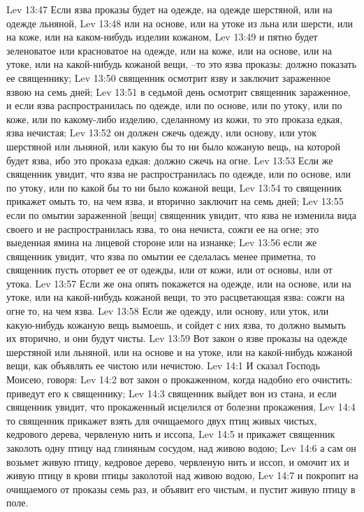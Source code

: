 Lev 13:47  Если язва проказы будет на одежде, на одежде шерстяной, или на одежде льняной,
Lev 13:48  или на основе, или на утоке из льна или шерсти, или на коже, или на каком-нибудь изделии кожаном,
Lev 13:49  и пятно будет зеленоватое или красноватое на одежде, или на коже, или на основе, или на утоке, или на какой-нибудь кожаной вещи, --то это язва проказы: должно показать ее священнику;
Lev 13:50  священник осмотрит язву и заключит зараженное язвою на семь дней;
Lev 13:51  в седьмой день осмотрит священник зараженное, и если язва распространилась по одежде, или по основе, или по утоку, или по коже, или по какому-либо изделию, сделанному из кожи, то это проказа едкая, язва нечистая;
Lev 13:52  он должен сжечь одежду, или основу, или уток шерстяной или льняной, или какую бы то ни было кожаную вещь, на которой будет язва, ибо это проказа едкая: должно сжечь на огне.
Lev 13:53  Если же священник увидит, что язва не распространилась по одежде, или по основе, или по утоку, или по какой бы то ни было кожаной вещи,
Lev 13:54  то священник прикажет омыть то, на чем язва, и вторично заключит на семь дней;
Lev 13:55  если по омытии зараженной [вещи] священник увидит, что язва не изменила вида своего и не распространилась язва, то она нечиста, сожги ее на огне; это выеденная ямина на лицевой стороне или на изнанке;
Lev 13:56  если же священник увидит, что язва по омытии ее сделалась менее приметна, то священник пусть оторвет ее от одежды, или от кожи, или от основы, или от утока.
Lev 13:57  Если же она опять покажется на одежде, или на основе, или на утоке, или на какой-нибудь кожаной вещи, то это расцветающая язва: сожги на огне то, на чем язва.
Lev 13:58  Если же одежду, или основу, или уток, или какую-нибудь кожаную вещь вымоешь, и сойдет с них язва, то должно вымыть их вторично, и они будут чисты.
Lev 13:59  Вот закон о язве проказы на одежде шерстяной или льняной, или на основе и на утоке, или на какой-нибудь кожаной вещи, как объявлять ее чистою или нечистою.
Lev 14:1  И сказал Господь Моисею, говоря:
Lev 14:2  вот закон о прокаженном, когда надобно его очистить: приведут его к священнику;
Lev 14:3  священник выйдет вон из стана, и если священник увидит, что прокаженный исцелился от болезни прокажения,
Lev 14:4  то священник прикажет взять для очищаемого двух птиц живых чистых, кедрового дерева, червленую нить и иссопа,
Lev 14:5  и прикажет священник заколоть одну птицу над глиняным сосудом, над живою водою;
Lev 14:6  а сам он возьмет живую птицу, кедровое дерево, червленую нить и иссоп, и омочит их и живую птицу в крови птицы заколотой над живою водою,
Lev 14:7  и покропит на очищаемого от проказы семь раз, и объявит его чистым, и пустит живую птицу в поле.

